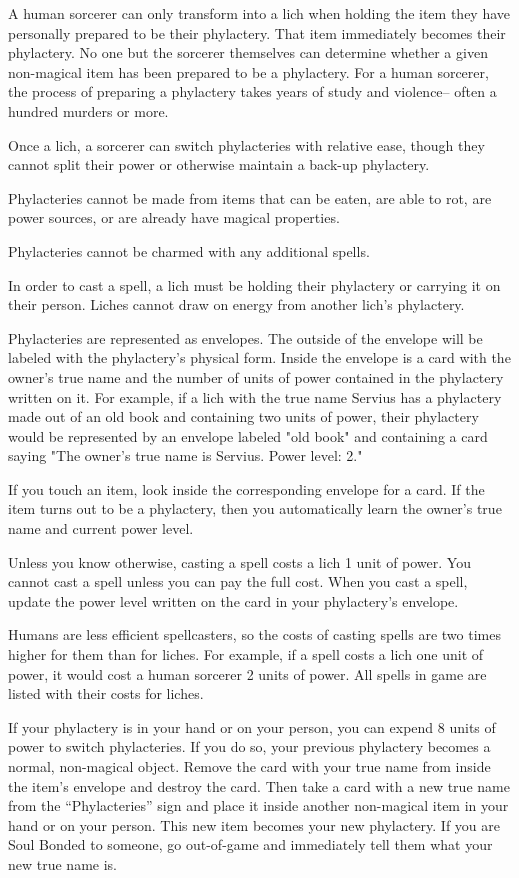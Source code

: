 \documentclass[green]{Sel}
\begin{document}
\name{\gPhylactery{}}
A human sorcerer can only transform into a lich when holding the item they have personally prepared to be their phylactery. That item immediately becomes their phylactery. No one but the sorcerer themselves can determine whether a given non-magical item has been prepared to be a phylactery. For a human sorcerer, the process of preparing a phylactery takes years of study and violence-- often a hundred murders or more. 

Once a lich, a sorcerer can switch phylacteries with relative ease, though they cannot split their power or otherwise maintain a back-up phylactery.

Phylacteries cannot be made from items that can be eaten, are able to rot, are power sources, or are already have magical properties.

Phylacteries cannot be charmed with any additional spells.

In order to cast a spell, a lich must be holding their phylactery or carrying it on their person. Liches cannot draw on energy from another lich's phylactery.

Phylacteries are represented as envelopes. The outside of the envelope will be labeled with the phylactery's physical form. Inside the envelope is a card with the owner's true name and the number of units of power contained in the phylactery written on it. For example, if a lich with the true name Servius has a phylactery made out of an old book and containing two units of power, their phylactery would be represented by an envelope labeled "old book" and containing a card saying "The owner's true name is Servius. Power level: 2."

If you touch an item, look inside the corresponding envelope for a card. If the item turns out to be a phylactery, then you automatically learn the owner's true name and current power level.

Unless you know otherwise, casting a spell costs a lich 1 unit of power. You cannot cast a spell unless you can pay the full cost. When you cast a spell, update the power level written on the card in your phylactery's envelope.

Humans are less efficient spellcasters, so the costs of casting spells are two times higher for them than for liches. For example, if a spell costs a lich one unit of power, it would cost a human sorcerer 2 units of power. All spells in game are listed with their costs for liches.

If your phylactery is in your hand or on your person, you can expend 8 units of power to switch phylacteries. If you do so, your previous phylactery becomes a normal, non-magical object. Remove the card with your true name from inside the item’s envelope and destroy the card. Then take a card with a new true name from the ``Phylacteries'' sign and place it inside another non-magical item in your hand or on your person. This new item becomes your new phylactery. If you are Soul Bonded to someone, go out-of-game and immediately tell them what your new true name is.
\end{document}
